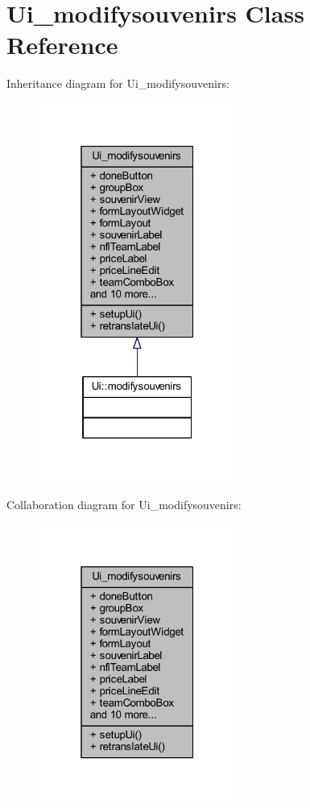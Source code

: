 \hypertarget{class_ui__modifysouvenirs}{}\section{Ui\+\_\+modifysouvenirs Class Reference}
\label{class_ui__modifysouvenirs}


Inheritance diagram for Ui\+\_\+modifysouvenirs\+:
\nopagebreak
\begin{figure}[H]
\begin{center}
\leavevmode
\includegraphics[width=184pt]{class_ui__modifysouvenirs__inherit__graph}
\end{center}
\end{figure}


Collaboration diagram for Ui\+\_\+modifysouvenirs\+:
\nopagebreak
\begin{figure}[H]
\begin{center}
\leavevmode
\includegraphics[width=184pt]{class_ui__modifysouvenirs__coll__graph}
\end{center}
\end{figure}
